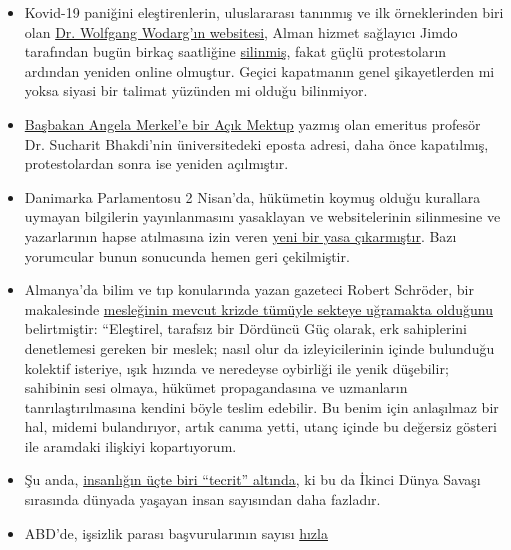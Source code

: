 \begin{itemize}
\tightlist
\item
  Kovid-19 paniğini eleştirenlerin, uluslararası tanınmış ve ilk
  örneklerinden biri olan \href{http://wodarg.com/}{Dr. Wolfgang
  Wodarg'ın websitesi}, Alman hizmet sağlayıcı Jimdo tarafından bugün
  birkaç saatliğine \href{https://twitter.com/wodarg}{silinmiş}, fakat
  güçlü protestoların ardından yeniden online olmuştur. Geçici
  kapatmanın genel şikayetlerden mi yoksa siyasi bir talimat yüzünden mi
  olduğu bilinmiyor.
\item
  \href{https://swprs.org/prof-dr-sucharit-bhakdiden-basbakan-dr-angela-merkele-acik-mektup/}{Başbakan
  Angela Merkel'e bir Açık Mektup} yazmış olan emeritus profesör Dr.
  Sucharit Bhakdi'nin üniversitedeki eposta adresi, daha önce
  kapatılmış, protestolardan sonra ise yeniden açılmıştır.
\item
  Danimarka Parlamentosu 2 Nisan'da, hükümetin koymuş olduğu kurallara
  uymayan bilgilerin yayınlanmasını yasaklayan ve websitelerinin
  silinmesine ve yazarlarının hapse atılmasına izin veren
  \href{https://newsvoice.se/2020/04/danmark-forbjuder-corona-policy/}{yeni
  bir yasa çıkarmıştır}. Bazı yorumcular bunun sonucunda hemen geri
  çekilmiştir.
\item
  Almanya'da bilim ve tıp konularında yazan gazeteci Robert Schröder,
  bir makalesinde
  \href{https://www.nachrichten-fabrik.de/news/harald-wiesendanger-ueber-die-massenmedien-waehrend-der-corona-krise-ich-schaeme-mich---meines-berufsstands-152103}{mesleğinin
  mevcut krizde tümüyle sekteye uğramakta olduğunu} belirtmiştir:
  ``Eleştirel, tarafsız bir Dördüncü Güç olarak, erk sahiplerini
  denetlemesi gereken bir meslek; nasıl olur da izleyicilerinin içinde
  bulunduğu kolektif isteriye, ışık hızında ve neredeyse oybirliği ile
  yenik düşebilir; sahibinin sesi olmaya, hükümet propagandasına ve
  uzmanların tanrılaştırılmasına kendini böyle teslim edebilir. Bu benim
  için anlaşılmaz bir hal, midemi bulandırıyor, artık canıma yetti,
  utanç içinde bu değersiz gösteri ile aramdaki ilişkiyi kopartıyorum.
\item
  Şu anda,
  \href{https://www.sciencealert.com/one-third-of-the-world-s-population-are-now-restricted-in-where-they-can-go}{insanlığın
  üçte biri ``tecrit'' altında}, ki bu da İkinci Dünya Savaşı sırasında
  dünyada yaşayan insan sayısından daha fazladır.
\item
  ABD'de, işsizlik parası başvurularının sayısı
  \href{https://www.reuters.com/article/us-health-coronavirus-usa-layoffs/us-weekly-jobless-claims-seen-at-record-high-again-idUSKBN21K0FX}{hızla
}
\end{itemize}
